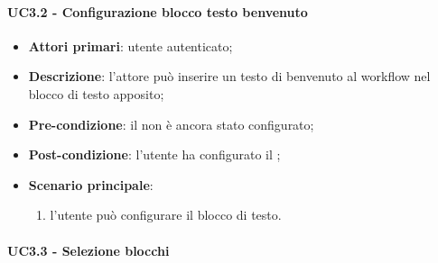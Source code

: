 \paragraph{UC3.2 - Configurazione blocco testo benvenuto}

\begin{itemize}
\item \textbf{Attori primari}:  utente autenticato;

\item \textbf{Descrizione}: l'attore può inserire un testo di benvenuto al workflow nel blocco di testo apposito;

\item \textbf{Pre-condizione}: il \BBenvenuto{} non è ancora stato configurato;

\item \textbf{Post-condizione}: l'utente ha configurato il \BBenvenuto{};

\item \textbf{Scenario principale}:
\begin{enumerate}
\item l'utente può configurare il blocco di testo.
\end{enumerate}
\end{itemize}

\pagebreak
\paragraph{UC3.3 - Selezione blocchi}

